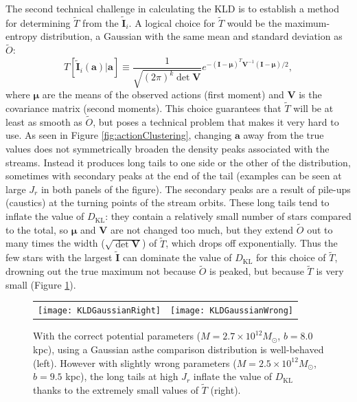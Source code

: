 \documentclass[useAMS,usenatbib,a4paper]{mn2e}
\newcommand{\sub}[2]{\ensuremath{#1_{\mathrm{#2}}}}
\begin{document}
The second technical challenge in calculating the KLD is to establish a method for determining $\tilde{T}$ from the $\tilde{\mathbf{I}}_i$. A logical choice for $\tilde{T}$ would be the maximum-entropy distribution, a Gaussian with the same mean and standard deviation as $\tilde{O}$:
\begin{equation}
 T[\tilde{\mathbf{I}}_i(\mathbf{a})|\mathbf{a}] \equiv \frac{1}{\sqrt{(2 \pi)^k \det \mathbf{V}}} e^{-(\mathbf{I}-\mathbf{\mu})^T \mathbf{V}^{-1} (\mathbf{I}-\mathbf{\mu})/2},
\end{equation} 
where $\mathbf{\mu}$ are the means of the observed actions (first moment) and $\mathbf{V}$ is the covariance matrix (second moments). This choice guarantees that $\tilde{T}$ will be at least as smooth as $\tilde{O}$, but poses a technical problem that makes it very hard to use. As seen in Figure \ref{fig:actionClustering}, changing $\mathbf{a}$ away from the true values does not symmetrically broaden the density peaks associated with the streams. Instead it produces long tails to one side or the other of the distribution, sometimes with secondary peaks at the end of the tail (examples can be seen at large $J_r$ in both panels of the figure). The secondary peaks are a result of pile-ups (caustics) at the turning points of the stream orbits. These long tails tend to inflate the value of $\sub{D}{KL}$: they contain a relatively small number of stars compared to the total, so $\mathbf{\mu}$ and $\mathbf{V}$ are not changed too much, but they extend $\tilde{O}$ out to many times the width ($\sqrt{\det \mathbf{V}}$) of $\tilde{T}$, which drops off exponentially. Thus the few stars with the largest $\tilde{\mathbf{I}}$ can dominate the value of $\sub{D}{KL}$ for this choice of $\tilde{T}$, drowning out the true maximum not because $\tilde{O}$ is peaked, but because $\tilde{T}$ is very small (Figure \ref{fig:KLDGaussianSmooth}).

\begin{figure}
 \begin{tabular}{cc}
\texttt{[image: KLDGaussianRight]} & \texttt{[image: KLDGaussianWrong]}
\end{tabular}
\caption{With the correct potential parameters ($M=2.7\times10^12 M_\odot$, $b=8.0$ kpc), using a Gaussian asthe comparison distribution is well-behaved (left). However with slightly wrong parameters ($M=2.5\times10^12 M_\odot$, $b=9.5$ kpc), the long tails at high $J_r$ inflate the value of $\sub{D}{KL}$ thanks to the extremely small values of $\tilde{T}$ (right).}
\label{fig:KLDGaussianSmooth}
\end{figure}
\end{document}
